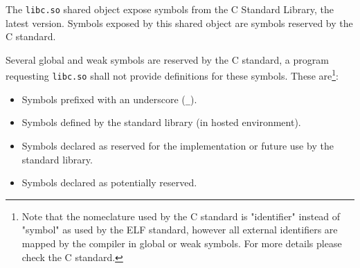 The \texttt{libc.so} shared object
expose symbols from the C Standard Library, the latest version\cite{ISO9899}.
Symbols exposed by this shared object are symbols reserved by the C standard.

Several global and weak symbols
are reserved by the C standard,
a program requesting \texttt{libc.so}
shall not provide definitions for these symbols.
These are\footnote{%
   Note that the nomeclature used by the C standard is
   "identifier" instead of "symbol" as used by the ELF standard,
   however all external identifiers are mapped by the compiler in
   global or weak symbols.
   For more details please check the C standard\cite{ISO9899}.
}:

\begin{itemize}
   \item Symbols prefixed with an underscore (\texttt{\_}).
   \item Symbols defined by the standard library (in hosted environment).
   \item Symbols declared as reserved for the implementation
   or future use by the standard library.
   \item Symbols declared as potentially reserved.
\end{itemize}
